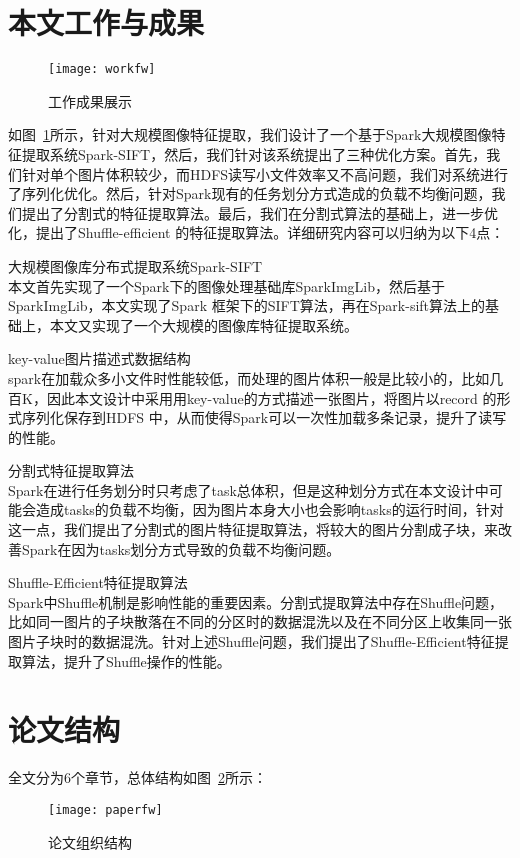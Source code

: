 \section{本文工作与成果}
\begin{figure}[htp]
\centering
\texttt{[image: workfw]}
\caption{工作成果展示}
\label{fig:workfw}
\end{figure}
如图~\ref{fig:workfw}所示，针对大规模图像特征提取，我们设计了一个基于Spark大规模图像特征提取系统Spark-SIFT，然后，我们针对该系统提出了三种优化方案。首先，我们针对单个图片体积较少，而HDFS读写小文件效率又不高问题，我们对系统进行了序列化优化。然后，针对Spark现有的任务划分方式造成的负载不均衡问题，我们提出了分割式的特征提取算法。最后，我们在分割式算法的基础上，进一步优化，提出了Shuffle-efficient 的特征提取算法。详细研究内容可以归纳为以下4点：
\begin{compactenum}
\item 大规模图像库分布式提取系统Spark-SIFT\\本文首先实现了一个Spark下的图像处理基础库SparkImgLib，然后基于SparkImgLib，本文实现了Spark 框架下的SIFT算法，再在Spark-sift算法上的基础上，本文又实现了一个大规模的图像库特征提取系统。
\item key-value图片描述式数据结构\\spark在加载众多小文件时性能较低，而处理的图片体积一般是比较小的，比如几百K，因此本文设计中采用用key-value的方式描述一张图片，将图片以record 的形式序列化保存到HDFS 中，从而使得Spark可以一次性加载多条记录，提升了读写的性能。
\item 分割式特征提取算法\\Spark在进行任务划分时只考虑了task总体积，但是这种划分方式在本文设计中可能会造成tasks的负载不均衡，因为图片本身大小也会影响tasks的运行时间，针对这一点，我们提出了分割式的图片特征提取算法，将较大的图片分割成子块，来改善Spark在因为tasks划分方式导致的负载不均衡问题。
\item Shuffle-Efficient特征提取算法\\Spark中Shuffle机制是影响性能的重要因素。分割式提取算法中存在Shuffle问题，比如同一图片的子块散落在不同的分区时的数据混洗以及在不同分区上收集同一张图片子块时的数据混洗。针对上述Shuffle问题，我们提出了Shuffle-Efficient特征提取算法，提升了Shuffle操作的性能。
\end{compactenum}

\section{论文结构}
全文分为6个章节，总体结构如图~\ref{fig:paperfw}所示：
\begin{figure}[htp]
\centering
\texttt{[image: paperfw]}
\caption{论文组织结构}
\label{fig:paperfw}
\end{figure}


